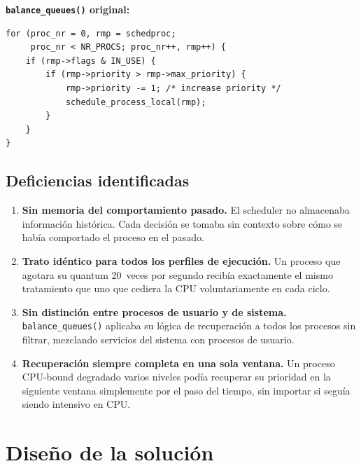 \documentclass[11pt,a4paper]{article}
\begin{document}
\bigskip\noindent\textbf{\texttt{balance\_queues()} original:}
\begin{lstlisting}[style=cstyle,caption={\texttt{balance\_queues()} antes de la modificaci\'on}]
for (proc_nr = 0, rmp = schedproc;
     proc_nr < NR_PROCS; proc_nr++, rmp++) {
    if (rmp->flags & IN_USE) {
        if (rmp->priority > rmp->max_priority) {
            rmp->priority -= 1; /* increase priority */
            schedule_process_local(rmp);
        }
    }
}
\end{lstlisting}

\subsection{Deficiencias identificadas}

\begin{enumerate}[leftmargin=*]

  \item \textbf{Sin memoria del comportamiento pasado.} El scheduler no almacenaba
        informaci\'on hist\'orica. Cada decisi\'on se tomaba sin contexto sobre c\'omo
        se hab\'ia comportado el proceso en el pasado.

  \item \textbf{Trato id\'entico para todos los perfiles de ejecuci\'on.} Un proceso
        que agotara su quantum 20~veces por segundo recib\'ia exactamente el mismo
        tratamiento que uno que cediera la CPU voluntariamente en cada ciclo.

  \item \textbf{Sin distinci\'on entre procesos de usuario y de sistema.}
        \texttt{balance\_queues()} aplicaba su l\'ogica de recuperaci\'on a todos los
        procesos sin filtrar, mezclando servicios del sistema con procesos de usuario.

  \item \textbf{Recuperaci\'on siempre completa en una sola ventana.} Un proceso
        CPU-bound degradado varios niveles pod\'ia recuperar su prioridad en la
        siguiente ventana simplemente por el paso del tiempo, sin importar si segu\'ia
        siendo intensivo en CPU.

\end{enumerate}

\section{Dise\~no de la soluci\'on}
\end{document}
